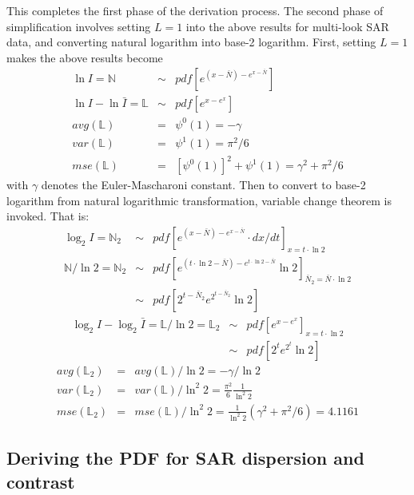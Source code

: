 \documentclass[journal]{IEEEtran}
\begin{document}
This completes the first phase of the derivation process.
The second phase of simplification involves setting $L=1$ into the above results for multi-look SAR data,
  and converting natural logarithm into base-2 logarithm.
First, setting $L=1$ makes the above results become
\begin{eqnarray*}
   \ln{I} = \mathbb{N} &\sim&  pdf \left[ e^{(x-\bar{N})-e^{x-\bar{N}}} \right] \\
   \ln{I} - \ln{\bar{I}} = \mathbb{L} &\sim& pdf \left[ e^{x-e^x}  \right] \\ 
    avg(\mathbb{L}) &=& \psi^0(1) = -\gamma \\
    var(\mathbb{L}) &=& \psi^1(1) = \pi^2 / 6 \\  
    mse(\mathbb{L}) &=& \left[ \psi^0(1) \right]^2 + \psi^1(1) = \gamma^2 + \pi^2 / 6
\end{eqnarray*}
with $\gamma$ denotes the Euler-Mascharoni constant.
Then to convert to base-2 logarithm from natural logarithmic transformation,
  variable change theorem is invoked.
  That is:
  \begin{eqnarray*}
   \log_2{I}  = \mathbb{N}_2    &\sim&  pdf \left[ e^{(x-\bar{N})-e^{x-\bar{N}}} \cdot dx/dt \right]_{x=t\cdot \ln{2}} \\
   \mathbb{N} / \ln{2} = \mathbb{N}_2 &\sim&  pdf \left[ e^{(t\cdot \ln{2}-\bar{N})-e^{t\cdot \ln{2}-\bar{N}}} \ln{2} \right]_{\bar{N}_2 = \bar{N} \cdot \ln{2}} \\
       &\sim&  pdf \left[ 2^{t-\bar{N}_2}e^{2^{t-\bar{N}_2}} \ln{2} \right] 
  \end{eqnarray*}
\begin{eqnarray*}
   \log_2{I} - \log_2{\bar{I}} = \mathbb{L} / \ln{2} = \mathbb{L}_2 &\sim& pdf \left[ e^{x-e^x}  \right]_{x=t \cdot \ln{2}} \\  
       &\sim& pdf \left[ 2^t e^{2^t} \ln{2}  \right] 
\end{eqnarray*}
\begin{eqnarray*}
  avg(\mathbb{L}_2) &=& avg(\mathbb{L})/ \ln{2} = -\gamma / \ln{2} \\
  var(\mathbb{L}_2) &=& var(\mathbb{L})/ \ln^2{2} = \frac{\pi^2}{6} \frac{1}{ \ln^2{2}} \\
  mse(\mathbb{L}_2) &=& mse(\mathbb{L})/ \ln^2{2} = \frac{1}{\ln^2{2}}( \gamma^2 + \pi^2/6 ) = 4.1161 
\end{eqnarray*}

\subsection{Deriving the PDF for SAR dispersion and contrast}
\end{document}
